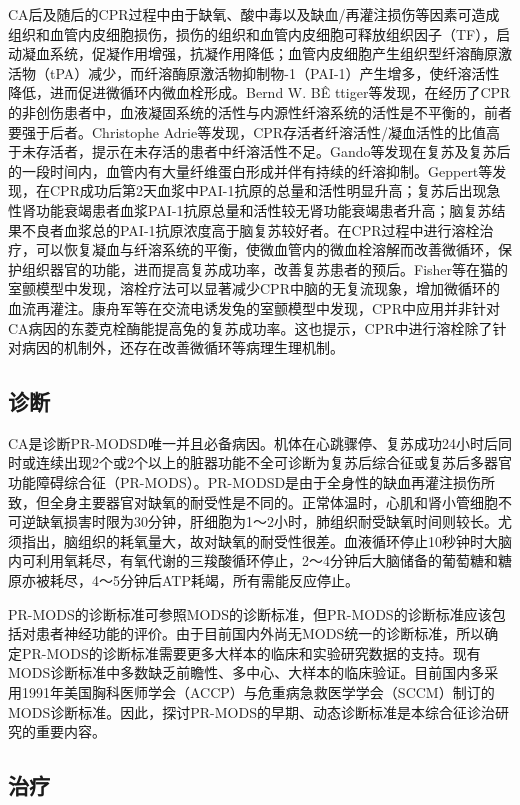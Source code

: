 CA后及随后的CPR过程中由于缺氧、酸中毒以及缺血/再灌注损伤等因素可造成组织和血管内皮细胞损伤，损伤的组织和血管内皮细胞可释放组织因子（TF），启动凝血系统，促凝作用增强，抗凝作用降低；血管内皮细胞产生组织型纤溶酶原激活物（tPA）减少，而纤溶酶原激活物抑制物-1（PAI-1）产生增多，使纤溶活性降低，进而促进微循环内微血栓形成。Bernd
W. BÊ
ttiger等发现，在经历了CPR的非创伤患者中，血液凝固系统的活性与内源性纤溶系统的活性是不平衡的，前者要强于后者。Christophe
Adrie等发现，CPR存活者纤溶活性/凝血活性的比值高于未存活者，提示在未存活的患者中纤溶活性不足。Gando等发现在复苏及复苏后的一段时间内，血管内有大量纤维蛋白形成并伴有持续的纤溶抑制。Geppert等发现，在CPR成功后第2天血浆中PAI-1抗原的总量和活性明显升高；复苏后出现急性肾功能衰竭患者血浆PAI-1抗原总量和活性较无肾功能衰竭患者升高；脑复苏结果不良者血浆总的PAI-1抗原浓度高于脑复苏较好者。在CPR过程中进行溶栓治疗，可以恢复凝血与纤溶系统的平衡，使微血管内的微血栓溶解而改善微循环，保护组织器官的功能，进而提高复苏成功率，改善复苏患者的预后。Fisher等在猫的室颤模型中发现，溶栓疗法可以显著减少CPR中脑的无复流现象，增加微循环的血流再灌注。康舟军等在交流电诱发兔的室颤模型中发现，CPR中应用并非针对CA病因的东菱克栓酶能提高兔的复苏成功率。这也提示，CPR中进行溶栓除了针对病因的机制外，还存在改善微循环等病理生理机制。

\subsection{诊断}

CA是诊断PR-MODSD唯一并且必备病因。机体在心跳骤停、复苏成功24小时后同时或连续出现2个或2个以上的脏器功能不全可诊断为复苏后综合征或复苏后多器官功能障碍综合征（PR-MODS）。PR-MODSD是由于全身性的缺血再灌注损伤所致，但全身主要器官对缺氧的耐受性是不同的。正常体温时，心肌和肾小管细胞不可逆缺氧损害时限为30分钟，肝细胞为1～2小时，肺组织耐受缺氧时间则较长。尤须指出，脑组织的耗氧量大，故对缺氧的耐受性很差。血液循环停止10秒钟时大脑内可利用氧耗尽，有氧代谢的三羧酸循环停止，2～4分钟后大脑储备的葡萄糖和糖原亦被耗尽，4～5分钟后ATP耗竭，所有需能反应停止。

PR-MODS的诊断标准可参照MODS的诊断标准，但PR-MODS的诊断标准应该包括对患者神经功能的评价。由于目前国内外尚无MODS统一的诊断标准，所以确定PR-MODS的诊断标准需要更多大样本的临床和实验研究数据的支持。现有MODS诊断标准中多数缺乏前瞻性、多中心、大样本的临床验证。目前国内多采用1991年美国胸科医师学会（ACCP）与危重病急救医学学会（SCCM）制订的MODS诊断标准。因此，探讨PR-MODS的早期、动态诊断标准是本综合征诊治研究的重要内容。

\subsection{治疗}

